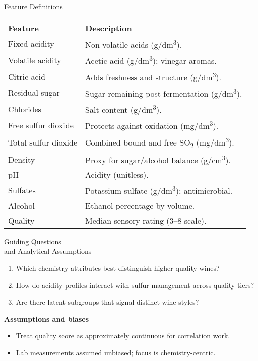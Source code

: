 \documentclass[aspectratio=169]{beamer}
\begin{document}
\begin{frame}{Feature Definitions}
  \scriptsize
  \begin{tabular}{p{}p{}}
    \toprule
    \textbf{Feature} & \textbf{Description} \\
    \midrule
    Fixed acidity & Non-volatile acids (g/dm\textsuperscript{3}). \\
    Volatile acidity & Acetic acid (g/dm\textsuperscript{3}); vinegar aromas. \\
    Citric acid & Adds freshness and structure (g/dm\textsuperscript{3}). \\
    Residual sugar & Sugar remaining post-fermentation (g/dm\textsuperscript{3}). \\
    Chlorides & Salt content (g/dm\textsuperscript{3}). \\
    Free sulfur dioxide & Protects against oxidation (mg/dm\textsuperscript{3}). \\
    Total sulfur dioxide & Combined bound and free SO\textsubscript{2} (mg/dm\textsuperscript{3}). \\
    Density & Proxy for sugar/alcohol balance (g/cm\textsuperscript{3}). \\
    pH & Acidity (unitless). \\
    Sulfates & Potassium sulfate (g/dm\textsuperscript{3}); antimicrobial. \\
    Alcohol & Ethanol percentage by volume. \\
    Quality & Median sensory rating (3--8 scale). \\
    \bottomrule
  \end{tabular}
\end{frame}

\begin{frame}{Guiding Questions \\ and Analytical Assumptions}
  \begin{enumerate}
    \item Which chemistry attributes best distinguish higher-quality wines?
    \item How do acidity profiles interact with sulfur management across quality tiers?
    \item Are there latent subgroups that signal distinct wine styles?
  \end{enumerate}
  \vspace{1em}
  \textbf{Assumptions and biases}
  \begin{itemize}
    \item Treat quality score as approximately continuous for correlation work.
    \item Lab measurements assumed unbiased; focus is chemistry-centric.
  \end{itemize}
\end{frame}
\end{document}
